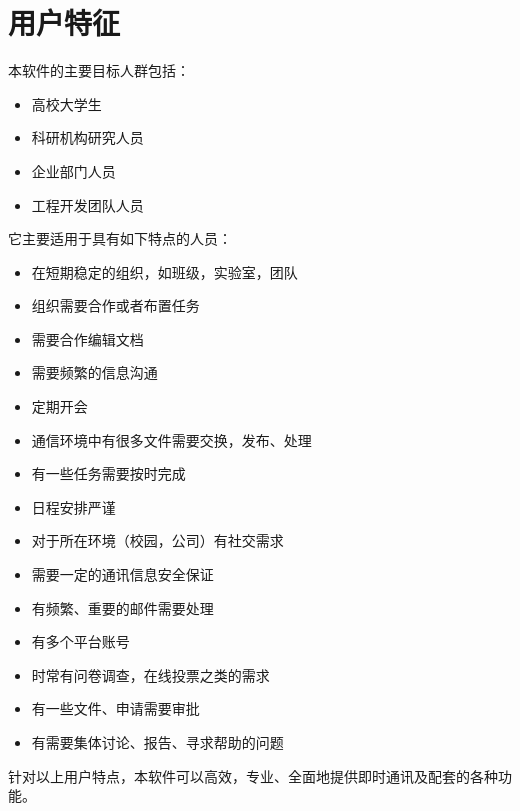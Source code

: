 \section{\color{red}用户特征}
\noindent
	本软件的主要目标人群包括：
	\begin{itemize}
		\item 高校大学生
		\item 科研机构研究人员
		\item 企业部门人员
		\item 工程开发团队人员
	\end{itemize}
	它主要适用于具有如下特点的人员：
	\begin{itemize}
		\item 在短期稳定的组织，如班级，实验室，团队
		\item 组织需要合作或者布置任务
		\item 需要合作编辑文档
		\item 需要频繁的信息沟通
		\item 定期开会
		\item 通信环境中有很多文件需要交换，发布、处理
		\item 有一些任务需要按时完成
		\item 日程安排严谨
		\item 对于所在环境（校园，公司）有社交需求
		\item 需要一定的通讯信息安全保证
		\item 有频繁、重要的邮件需要处理
		\item {\color{red}有多个平台账号}
		\item {\color{red}时常有问卷调查，在线投票之类的需求}
		\item {\color{red}有一些文件、申请需要审批}
		\item {\color{red}有需要集体讨论、报告、寻求帮助的问题}
	\end{itemize}
	针对以上用户特点，本软件可以高效，专业、全面地提供即时通讯及配套的各种功能。
